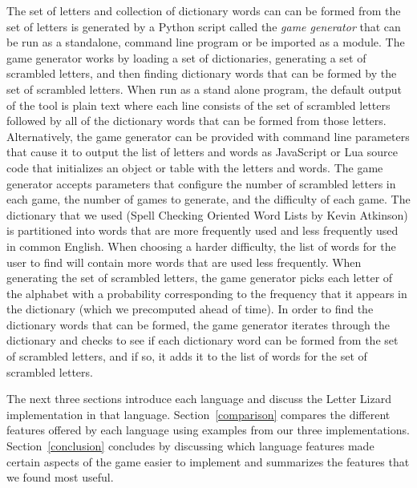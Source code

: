 The set of letters and collection of dictionary words can can be formed from the set of letters
is generated by a Python script called the \emph{game generator} that can be run as a standalone,
command line program or be imported as a module. The game generator works by loading a set
of dictionaries, generating a set of scrambled letters, and then finding dictionary words that can
be formed by the set of scrambled letters. When run as a stand alone program, the default output of the
tool is plain text where each line consists of the set of scrambled letters followed by all of the 
dictionary words that can be formed from those letters. Alternatively, the game generator can be provided
with command line parameters that cause it to output the list of letters and words as JavaScript or Lua 
source code that initializes an object or table with the letters and words.
The game generator accepts parameters that configure the
number of scrambled letters in each game, the number of games to generate, and the difficulty
of each game. The dictionary that we used (Spell Checking Oriented Word Lists by Kevin
Atkinson) is partitioned into words that are more frequently used and less frequently used in
common English. When choosing a harder difficulty, the list of words for the user to find will
contain more words that are used less frequently.
When generating the set of scrambled letters, the game generator picks each letter of the alphabet with a
probability corresponding to the frequency that it appears in the dictionary (which we
precomputed ahead of time). In order to find the dictionary words that can be formed, the game generator
iterates through the dictionary and checks to see if each dictionary word can be formed from the set of 
scrambled letters, and if so, it adds it to the list of words for the set of scrambled letters.

The next three sections introduce each language and discuss the Letter Lizard implementation in
that language. Section~\ref{comparison} compares the different features offered by each language using
examples from our three implementations. Section~\ref{conclusion} concludes by discussing which
language features made certain aspects of the game easier to implement and summarizes the features
that we found most useful.